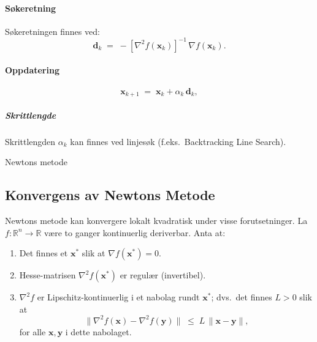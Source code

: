 \paragraph{Søkeretning}
Søkeretningen finnes ved:
\[
  \symbf{d}_k 
  \;=\; 
  -[\nabla^2 f(\symbf{x}_k)]^{-1}\,\nabla f(\symbf{x}_k).
\]
\paragraph{Oppdatering}
\[
  \symbf{x}_{k+1} 
  \;=\; 
  \symbf{x}_k + \alpha_k \,\symbf{d}_k,
\]
\subparagraph{Skrittlengde}
Skrittlengden \(\alpha_k\) kan finnes ved linjesøk (f.eks.\ Backtracking Line Search).

\begin{algorithm}[H]
  \SetAlgoLined
  \caption{Newtons metode}
\end{algorithm}

\subsection{Konvergens av Newtons Metode}
Newtons metode kan konvergere lokalt kvadratisk under visse forutsetninger. La \( f : \mathbb{R}^n \to \mathbb{R} \) være to ganger kontinuerlig deriverbar. Anta at:

\begin{enumerate}
  \item Det finnes et \(\symbf{x}^*\) slik at \(\nabla f(\symbf{x}^*) = 0\).
  \item Hesse-matrisen \(\nabla^2 f(\symbf{x}^*)\) er regulær (invertibel).
  \item \(\nabla^2 f\) er Lipschitz-kontinuerlig i et nabolag rundt \(\symbf{x}^*\); dvs.\ det finnes \( L > 0 \) slik at
        \[
          \| \nabla^2 f(\symbf{x}) - \nabla^2 f(\symbf{y}) \| 
          \;\le\; 
          L\,\|\symbf{x} - \symbf{y}\|,
        \]
        for alle \(\symbf{x}, \symbf{y}\) i dette nabolaget.
\end{enumerate}


